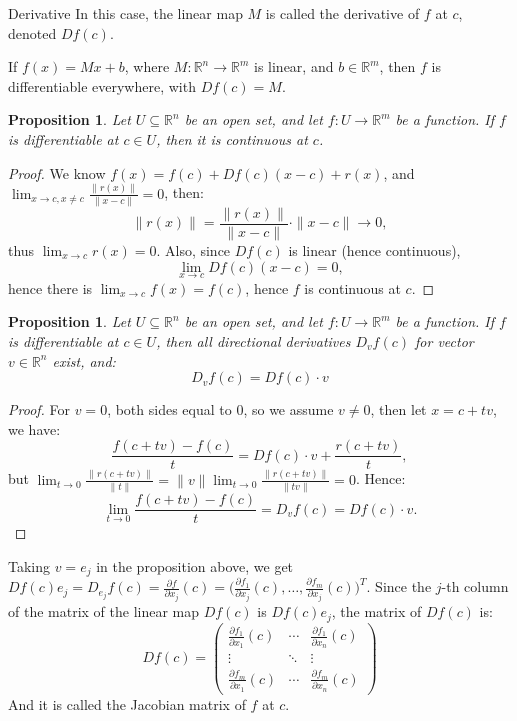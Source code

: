 \documentclass[11pt]{article}
\makeatletter
\newcounter{thmcounter}
\newenvironment{definition}[1]{\begin{defbox}{#1}{}}{\end{defbox}}
\newenvironment{example}[1]{\begin{exbox}{#1}{}}{\end{exbox}}
\theoremstyle{quiet}
\newtheorem{proposition}[thmcounter]{Proposition}
\newtheorem{proposition}[tcb@cnt@defbox]{Proposition}
\theoremstyle{quietremark}
\makeatother
\begin{document}
\begin{definition}{Derivative}
In this case, the linear map $M$ is called the derivative of $f$ at $c$, denoted $Df(c)$.
\end{definition} 

\begin{example}{}
If $f(x)=Mx+b$, where $M:\mathbb{R}^n\to\mathbb{R}^m$ is linear, and $b\in\mathbb{R}^m$, then $f$ is differentiable everywhere, with $Df(c)=M$.
\end{example}

\begin{proposition}
Let $U\subseteq\mathbb{R}^n$ be an open set, and let $f:U\to\mathbb{R}^m$ be a function. If $f$ is differentiable at $c\in U$, then it is continuous at $c$.
\end{proposition}

\begin{proof}
We know $f(x)=f(c)+Df(c)(x-c)+r(x)$, and $\displaystyle\lim_{x\to c,x\ne c}\frac{\|r(x)\|}{\|x-c\|}=0$, then:
\[
\|r(x)\|=\frac{\|r(x)\|}{\|x-c\|}\cdot\|x-c\|\to 0,
\]
thus $\displaystyle\lim_{x\to c}r(x)=0$. Also,  since $Df(c)$ is linear (hence continuous), 
\[
\lim_{x\to c} Df(c)(x-c)=0,
\]
hence there is $\displaystyle\lim_{x\to c}f(x)=f(c)$, hence $f$ is continuous at $c$.
\end{proof}

\begin{proposition}
Let $U\subseteq\mathbb{R}^n$ be an open set, and let $f:U\to\mathbb{R}^m$ be a function. If $f$ is differentiable at $c\in U$, then all directional derivatives $D_vf(c)$ for vector $v\in\mathbb{R}^n$ exist, and:
\[
D_vf(c)=Df(c)\cdot v
\]
\end{proposition}

\begin{proof}
For $v=0$, both sides equal to $0$, so we assume $v\ne 0$, then let $x=c+tv$, we have:
\[
\frac{f(c+tv)-f(c)}{t}=Df(c)\cdot v+\frac{r(c+tv)}{t},
\]
but $\lim_{t\to 0}\frac{\|r(c+tv)\|}{\|t\|}=\|v\|\lim_{t\to 0}\frac{\|r(c+tv)\|}{\|tv\|}=0$. Hence:
\[
\lim_{t\to 0}\frac{f(c+tv)-f(c)}{t}=D_vf(c)=Df(c)\cdot v.
\]
\end{proof}

Taking $v=e_j$ in the proposition above, we get
$Df(c)e_j = D_{e_j}f(c)=\frac{\partial f}{\partial x_j}(c)
=\Big(\tfrac{\partial f_1}{\partial x_j}(c),\dots,\tfrac{\partial f_m}{\partial x_j}(c)\Big)^T$.
Since the $j$-th column of the matrix of the linear map $Df(c)$ is $Df(c)e_j$, the matrix of $Df(c)$ is:
\[
Df(c)=
\begin{pmatrix}
\frac{\partial f_1}{\partial x_1}(c) & \cdots & \frac{\partial f_1}{\partial x_n}(c) \\
\vdots & \ddots & \vdots \\
\frac{\partial f_m}{\partial x_1}(c) & \cdots & \frac{\partial f_m}{\partial x_n}(c)
\end{pmatrix}
\]
And it is called the Jacobian matrix of $f$ at $c$.
\end{document}
